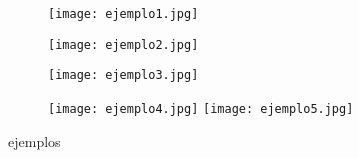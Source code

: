 \begin{figure}[]
	\begin{subfigure}{.48\textwidth}
		\texttt{[image: ejemplo1.jpg]}
	\end{subfigure}
	\begin{subfigure}{.48\textwidth}
		\texttt{[image: ejemplo2.jpg]}
	\end{subfigure}
	\begin{subfigure}{.45\textwidth}
		\texttt{[image: ejemplo3.jpg]}
	\end{subfigure}
	\begin{subfigure}{.45\textwidth}
		\texttt{[image: ejemplo4.jpg]}
		\texttt{[image: ejemplo5.jpg]}
	\end{subfigure}
	\caption{ejemplos}
	\label{fig:Ejmeplos}
\end{figure}
